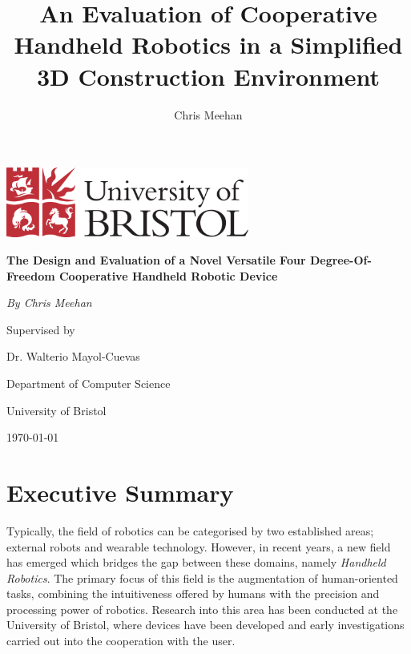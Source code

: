 \documentclass[11pt]{article}
\title{An Evaluation of Cooperative Handheld Robotics in a Simplified 3D Construction Environment}
\author{Chris Meehan}
\begin{document}
\begin{titlepage}
	\centering
	
	\includegraphics[width=0.6\textwidth]{bristol.png}
	\vspace{2cm}

	{\huge\bfseries The Design and Evaluation of a Novel Versatile Four Degree-Of-Freedom Cooperative Handheld Robotic Device\par}
	\vspace{1.5cm}

	{\Large\itshape By Chris Meehan\par}
	
	Supervised by\par
	Dr. Walterio Mayol-Cuevas
	
	\vspace{1.5cm}
	
	Department of Computer Science\par
	University of Bristol

	\vfill

	{\large \today\par}
\end{titlepage}




\pagestyle{roman}
\renewcommand{\thepage}{\roman{page}}%
\section*{Executive Summary}

Typically, the field of robotics can be categorised by two established areas; external robots and wearable technology. However, in recent years, a new field has emerged which bridges the gap between these domains, namely \textit{Handheld Robotics}. The primary focus of this field is the augmentation of human-oriented tasks, combining the intuitiveness offered by humans with the precision and processing power of robotics. Research into this area has been conducted at the University of Bristol, where devices have been developed and early investigations carried out into the cooperation with the user.
\end{document}
